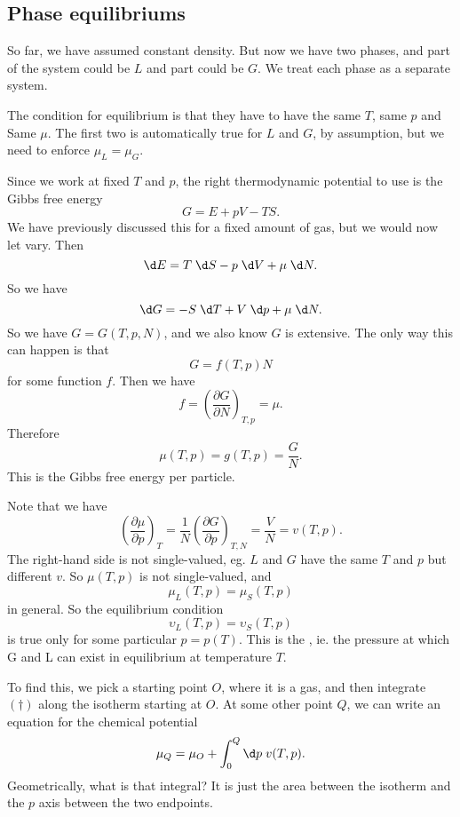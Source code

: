 \documentclass[a4paper]{article}
\begin{document}
\subsection{Phase equilibriums}
So far, we have assumed constant density. But now we have two phases, and part of the system could be $L$ and part could be $G$. We treat each phase as a separate system.

The condition for equilibrium is that they have to have the same $T$, same $p$ and Same $\mu$. The first two is automatically true for $L$ and $G$, by assumption, but we need to enforce $\mu_L = \mu_G$.

Since we work at fixed $T$ and $p$, the right thermodynamic potential to use is the Gibbs free energy
\[
  G = E + pV - TS.
\]
We have previously discussed this for a fixed amount of gas, but we would now let vary. Then
\[
  \d E = T\;\d S - p\;\d V + \mu \;\d N.
\]
So we have
\[
  \d G = - S\;\d T + V \;\d p + \mu \;\d N.
\]
So we have $G = G(T, p, N)$, and we also know $G$ is extensive. The only way this can happen is that
\[
  G = f(T, p) N
\]
for some function $f$. Then we have
\[
  f = \left(\frac{\partial G}{\partial N}\right)_{T, p} = \mu.
\]
Therefore
\[
  \mu(T, p) = g(T, p) = \frac{G}{N}.
\]
This is the Gibbs free energy per particle.

Note that we have
\[
  \left(\frac{\partial \mu}{\partial p}\right)_T = \frac{1}{N} \left(\frac{\partial G}{\partial p}\right)_{T, N} = \frac{V}{N} = v(T, p).\tag{$\dagger$}
\]
The right-hand side is not single-valued, eg. $L$ and $G$ have the same $T$ and $p$ but different $v$. So $\mu(T, p)$ is not single-valued, and
\[
  \mu_L(T, p) = \mu_S(T, p)
\]
in general. So the equilibrium condition
\[
  \upsilon_L(T, p) = \upsilon_S(T, p)
\]
is true only for some particular $p = p(T)$. This is the , ie. the pressure at which G and L can exist in equilibrium at temperature $T$.

To find this, we pick a starting point $O$, where it is a gas, and then integrate $(\dagger)$ along the isotherm starting at $O$. At some other point $Q$, we can write an equation for the chemical potential
\[
  \mu_Q= \mu_O + \int_0^Q \d p\; v(T, p).
\]
Geometrically, what is that integral? It is just the area between the isotherm and the $p$ axis between the two endpoints.
\end{document}
